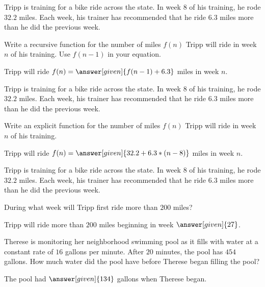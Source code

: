 \documentclass[nooutcomes]{ximera}
\begin{document}
\begin{problem}
Tripp is training for a bike ride across the state.  In week 8 of his training, he rode $32.2$ miles.  Each week, his trainer has recommended that he ride $6.3$ miles more than he did the previous week.

Write a recursive function for the number of miles $f(n)$ Tripp will ride in week $n$ of his training.  Use $f(n-1)$ in your equation.

\begin{prompt}
Tripp will ride $f(n) = \answer[given]{f(n-1) + 6.3}$ miles in week $n$.
\end{prompt}
\end{problem}



\begin{problem}
Tripp is training for a bike ride across the state.  In week 8 of his training, he rode $32.2$ miles.  Each week, his trainer has recommended that he ride $6.3$ miles more than he did the previous week.

Write an explicit function for the number of miles $f(n)$ Tripp will ride in week $n$ of his training.

\begin{prompt}
Tripp will ride $f(n) = \answer[given]{32.2 + 6.3*(n-8)}$ miles in week $n$.
\end{prompt}
\end{problem}




\begin{problem}
Tripp is training for a bike ride across the state.  In week 8 of his training, he rode $32.2$ miles.  Each week, his trainer has recommended that he ride $6.3$ miles more than he did the previous week.

During what week will Tripp first ride more than $200$ miles?

\begin{prompt}
Tripp will ride more than $200$ miles beginning in week $\answer[given]{27}$.
\end{prompt}
\end{problem}





\begin{problem}
Therese is monitoring her neighborhood swimming pool as it fills with water at a constant rate of $16$ gallons per minute.  After $20$ minutes, the pool has $454$ gallons.  How much water did the pool have before Therese began filling the pool?

\begin{prompt}
The pool had $\answer[given]{134}$ gallons when Therese began.
\end{prompt}
\end{problem}
\end{document}

